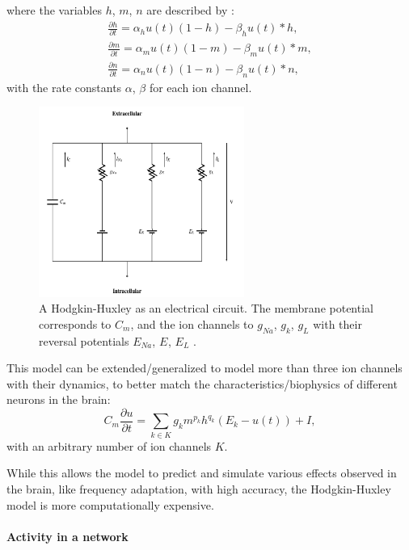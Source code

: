 where the variables $h$, $m$, $n$  are described by :
\[
\begin{split}
	\frac{\partial h}{\partial t} = \alpha_h u(t) (1-h) - \beta_h u(t) * h , \\
	\frac{\partial m}{\partial t} = \alpha_m u(t) (1-m) - \beta_m u(t) * m , \\
	\frac{\partial n}{\partial t} = \alpha_n u(t) (1-n) - \beta_n u(t) * n ,
\end{split}
\]
with the rate constants $\alpha$, $\beta$ for each ion channel.

\begin{figure}
	\centering
    	\includegraphics[width=0.6\textwidth]{imgs/hode_hux.png} 
    \caption{A Hodgkin-Huxley as an electrical circuit. The membrane potential corresponds to $C_m$, and the ion channels to $g_{Na}$, $g_{k}$, $g_{L}$ with their reversal potentials $E_{Na}$, $E_{}$, $E_{L}$ \cite{heikoMA}.}
	\label{fig:hogdehux}
\end{figure}

This model can be extended/generalized to model more than three ion channels with their dynamics, to better match the characteristics/biophysics of different neurons in the brain:
\[
C_m \frac{\partial u}{\partial t} = \sum_{k \in K} g_k m^{p_k} h^{q_k} (E_k - u(t)) + I,
\]
with an arbitrary number of ion channels $K$.

While this allows the model to predict and simulate various effects observed in the brain, like frequency adaptation, with high accuracy, the Hodgkin-Huxley model is more computationally expensive.

\paragraph{Activity in a network} \label{c:poissonspikes}

